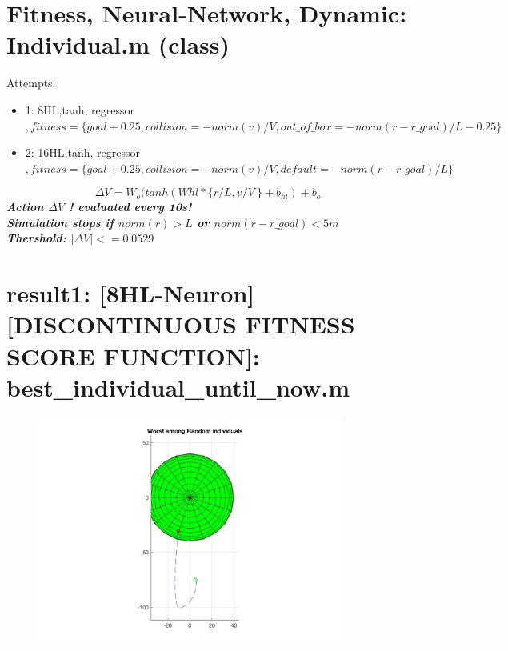\documentclass[a4paper,6pt]{article}
\theoremstyle{Definition}
\theoremstyle{Theorem}
\begin{document}
\section{Fitness, Neural-Network, Dynamic: Individual.m (class) }

Attempts:
\begin{itemize}
\item{1: 8HL,tanh, regressor  $, fitness = \{goal +0.25, collision = -norm(v)/V, out\_of\_box= -norm(r-r\_goal)/L -0.25\}$}
\item{2: 16HL,tanh, regressor $, fitness = \{goal +0.25, collision = -norm(v)/V, default= -norm(r-r\_goal)/L\}$}
\end{itemize}

\begin{equation}
\Delta V = W_o (tanh(Whl * \{r/L, v/V \ \}+ b_{hl}) + b_{o}
\end{equation}
\textbf{\textsl{Action $\Delta V$ ! evaluated every 10s!}}\\
\textbf{\textsl{Simulation stops if $norm(r) > L $ or  $norm(r-r\_goal) < 5m$ }}\\
\textbf{\textsl{Thershold: $ \lvert \Delta V \lvert <= 0.0529$ }}

\section{result1: [8HL-Neuron][DISCONTINUOUS FITNESS SCORE FUNCTION]: \\ best\_individual\_until\_now.m }

 
 \begin{figure}[H]
 	\begin{center}
 		\includegraphics[width=10cm]{worst_among_random_Initial_individuals.jpg}
 		
 	\end{center}
 \end{figure}
 
\end{document}
